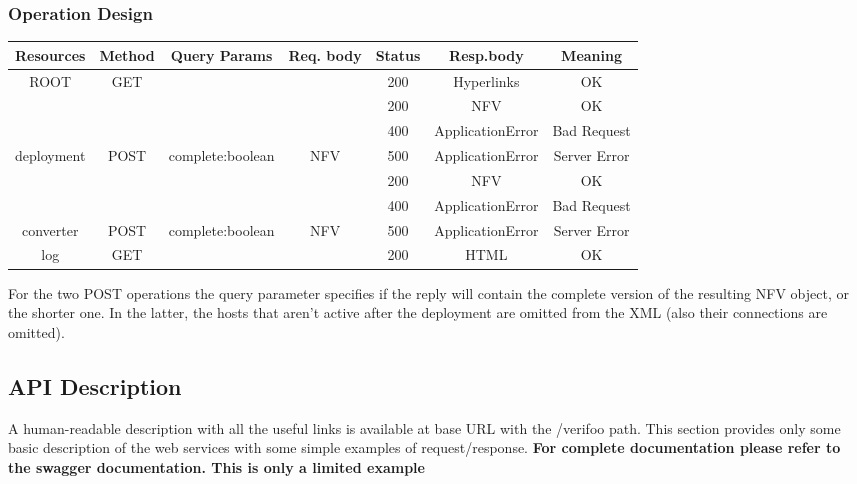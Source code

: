 \documentclass[a4paper,11pt]{article}
\begin{document}
\subsubsection*{Operation Design}
\begin{center}
    \begin{tabular}[t]{ | c | c | c | c | c | c | c |}
    \hline
    Resources & Method & Query Params & Req. body & Status & Resp.body & Meaning \\ \hline \hline
    ROOT & GET & &  & 200 & Hyperlinks & OK\\ \hline
                                            &  &  &  & 200 & NFV & OK\\
                                            &  &  &  & 400 & ApplicationError & Bad Request\\
     \multirow{-3}{*}{deployment} & \multirow{-3}{*}{POST} & \multirow{-3}{*}{complete:boolean} & \multirow{-3}{*}{NFV} 
                                            & 500 & ApplicationError & Server Error\\ \hline
                                            &  &  &  & 200 & NFV & OK\\
                                            &  &  &  & 400 & ApplicationError & Bad Request\\
     \multirow{-3}{*}{converter} & \multirow{-3}{*}{POST} & \multirow{-3}{*}{complete:boolean} & \multirow{-2}{*}{NFV} 
                                            & 500 & ApplicationError & Server Error\\ \hline
    log & GET &  &  & 200 & HTML & OK \\ \hline
    \end{tabular}
\end{center}
For the two POST operations the query parameter specifies if the reply will contain the complete version of the resulting NFV object, or the shorter one. In the latter, the hosts that aren't active after the deployment are omitted from the XML (also their connections are omitted).
\newpage
\subsection{API Description}
A human-readable description with all the useful links is available at base URL with the /verifoo path. This section provides only some basic description of the web services with some simple examples of request/response.
\textbf{For complete documentation please refer to the swagger documentation. This is only a limited example}
\end{document}
